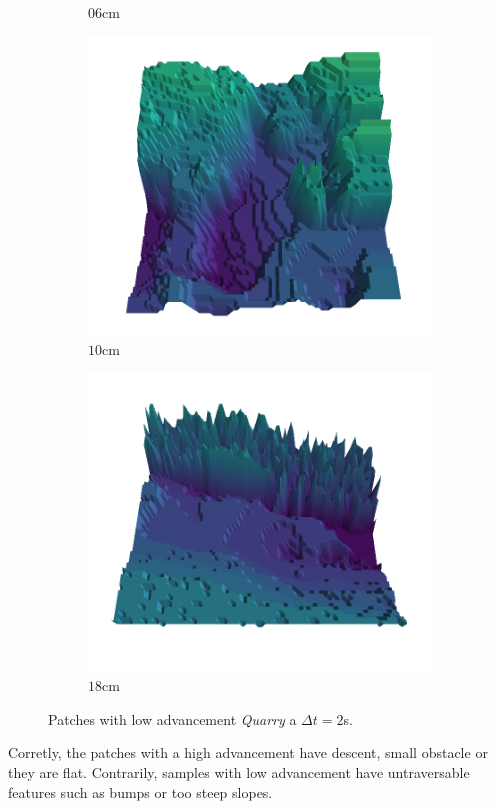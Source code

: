 \documentclass[../document.tex]{subfiles}
\begin{document}
\begin{figure}[htbp]
\begin{subfigure}[b]{0.19\textwidth}
        \caption{$06$cm}
        \end{subfigure}
        \begin{subfigure}[b]{0.19\textwidth}
        \includegraphics[width=\linewidth]{../img/5/quarry/all/worst/10-patch-3d-majavi-colormap-8.png}
        \caption{$10$cm}
        \end{subfigure}
        \begin{subfigure}[b]{0.19\textwidth}
        \includegraphics[width=\linewidth]{../img/5/quarry/all/worst/18-patch-3d-majavi-colormap-9.png}
        \caption{$18$cm}
        \end{subfigure}
        \caption{Patches with low advancement \emph{Quarry} a $\Delta t = 2$s.}
    \end{figure}
Corretly, the patches with a high advancement have descent, small obstacle or they are flat. Contrarily, samples with low advancement have untraversable features such as bumps or too steep slopes.
\end{document}
